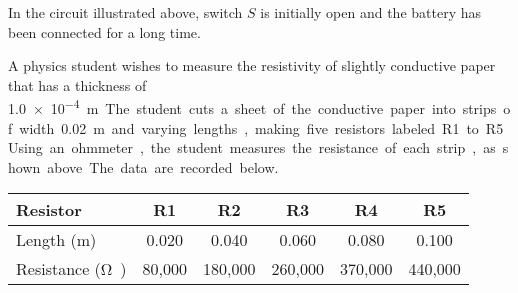 \documentclass{../../oss-classkick-exam}
\begin{document}
\begin{questions}
  \question In the circuit illustrated above, switch $S$ is initially open and
  the battery has been connected for a long time.
  \newpage

  
  \question A physics student wishes to measure the resistivity of slightly
  conductive paper that has a thickness of \SI{1.0e-4}\metre. The student cuts
  a sheet of the conductive paper into strips of width \SI{.02}{\metre} and
  varying lengths, making five resistors labeled R1 to R5. Using an ohmmeter,
  the student measures the resistance of each strip, as shown above. The data
  are recorded below.
  \begin{center}
    \begin{tabular}{|l|c|c|c|c|c|}
      \hline
      Resistor & R1 & R2 & R3 & R4 & R5 \\ \hline
      Length (m) & 0.020 & 0.040 & 0.060 & 0.080 & 0.100\\ \hline
      Resistance (\si\ohm) & 80,000 & 180,000 & 260,000 & 370,000 & 440,000\\
      \hline
    \end{tabular}
  \end{center}
  \begin{parts}

\end{parts}
\end{questions}
\end{document}
